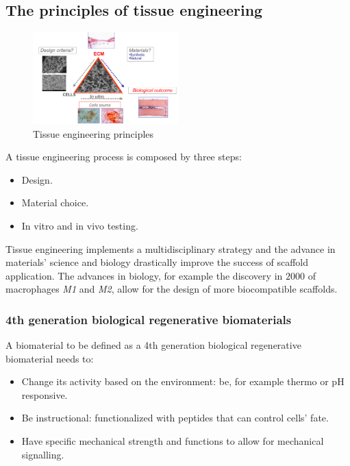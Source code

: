 	\subsection{The principles of tissue engineering}

	\begin{figure}[ht]
		\centering
		\includegraphics[width=0.5\textwidth]{triangolo.png}
		\caption{Tissue engineering principles}
		\label{fig:triangle}
	\end{figure}

	A tissue engineering process is composed by three steps:

	\begin{multicols}{3}
		\begin{itemize}
			\item Design.
			\item Material choice.
			\item In vitro and in vivo testing.
		\end{itemize}
	\end{multicols}

	Tissue engineering implements a multidisciplinary strategy and the advance in materials' science and biology drastically improve the success of scaffold application.
	The advances in biology, for example the discovery in $2000$ of macrophages \emph{M1} and \emph{M2}, allow for the design of more biocompatible scaffolds.


		\subsubsection{4th generation biological regenerative biomaterials}
		A biomaterial to be defined as a 4th generation biological regenerative biomaterial needs to:

		\begin{multicols}{2}
			\begin{itemize}
				\item Change its activity based on the environment: be, for example thermo or pH responsive.
				\item Be instructional: functionalized with peptides that can control cells' fate.
				\item Have specific mechanical strength and functions to allow for mechanical signalling.
			\end{itemize}
		\end{multicols}


